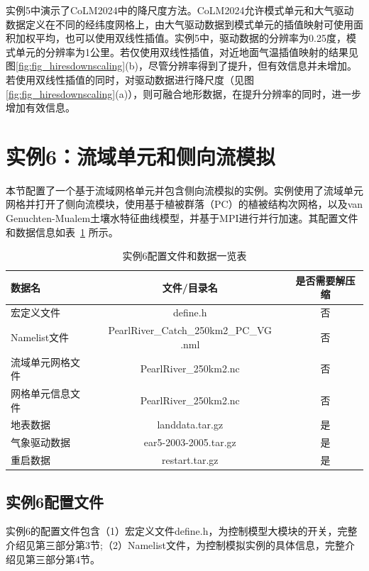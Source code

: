 实例5中演示了CoLM2024中的降尺度方法。CoLM2024允许模式单元和大气驱动数据定义在不同的经纬度网格上，由大气驱动数据到模式单元的插值映射可使用面积加权平均，也可以使用双线性插值。实例5中，驱动数据的分辨率为0.25度，模式单元的分辨率为1公里。若仅使用双线性插值，对近地面气温插值映射的结果见图\ref{fig:fig_hiresdownscaling}(b)，尽管分辨率得到了提升，但有效信息并未增加。若使用双线性插值的同时，对驱动数据进行降尺度（见图\ref{fig:fig_hiresdownscaling}(a)），则可融合地形数据，在提升分辨率的同时，进一步增加有效信息。



\section{实例6：流域单元和侧向流模拟}

本节配置了一个基于流域网格单元并包含侧向流模拟的实例。实例使用了流域单元网格并打开了侧向流模块，使用基于植被群落（PC）的植被结构次网格，以及van Genuchten-Mualem土壤水特征曲线模型，并基于MPI进行并行加速。其配置文件和数据信息如表~\ref{ex6table} 所示。

\begin{table}[htbp]
\caption{实例6配置文件和数据一览表}
\centering \renewcommand{\arraystretch}{1.5}
\label{ex6table}
\begin{tabular}{lcc}
\toprule
\textbf{数据名} & \textbf{文件/目录名} & \textbf{是否需要解压缩} \\\midrule
宏定义文件 & define.h & 否 \\
Namelist文件 & PearlRiver\_Catch\_250km2\_PC\_VG .nml & 否 \\
流域单元网格文件 & PearlRiver\_250km2.nc & 否\\
网格单元信息文件 & PearlRiver\_250km2.nc & 否 \\
地表数据 & landdata.tar.gz & 是 \\
气象驱动数据 & ear5-2003-2005.tar.gz & 是 \\
重启数据 & restart.tar.gz & 是 \\

\bottomrule
\end{tabular}
\end{table}

\subsection{实例6配置文件}\label{ex6config}
实例6的配置文件包含（1）宏定义文件define.h，为控制模型大模块的开关，完整介绍见第三部分第3节;（2）Namelist文件，为控制模拟实例的具体信息，完整介绍见第三部分第4节。

